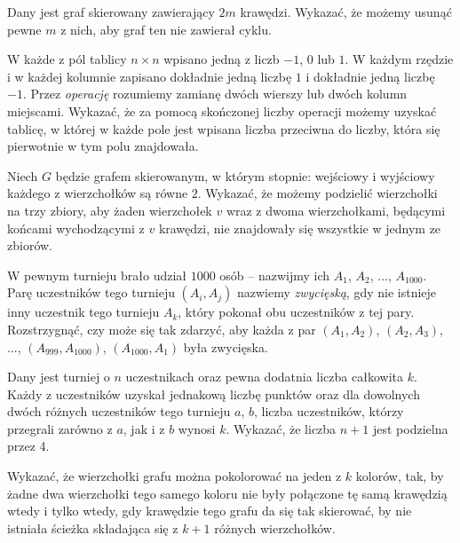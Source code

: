 \begin{problem}{1}
	Dany jest graf skierowany zawierający $2m$ krawędzi. Wykazać, że możemy usunąć pewne $m$ z nich, aby graf ten nie zawierał cyklu.
\end{problem}

\begin{problem}{2}
	W każde z pól tablicy $n\times n$ wpisano jedną z liczb $-1$, $0$ lub $1$. W każdym rzędzie i w każdej kolumnie zapisano dokładnie jedną liczbę $1$ i dokładnie jedną liczbę $-1$. Przez \textit{operację} rozumiemy zamianę dwóch wierszy lub dwóch kolumn miejscami. Wykazać, że za pomocą skończonej liczby operacji możemy uzyskać tablicę, w której w każde pole jest wpisana liczba przeciwna do liczby, która się pierwotnie w tym polu znajdowała.
\end{problem}

\begin{problem}{3}
	Niech $G$ będzie grafem skierowanym, w którym stopnie: wejściowy i wyjściowy każdego z wierzchołków są równe $2$. Wykazać, że możemy podzielić wierzchołki na trzy zbiory, aby żaden wierzchołek $v$ wraz z dwoma wierzchołkami, będącymi końcami wychodzącymi z $v$ krawędzi, nie znajdowały się wszystkie w jednym ze zbiorów.
\end{problem}

\begin{problem}{4}
	W pewnym turnieju brało udział $1000$ osób -- nazwijmy ich $A_1$, $A_2$, ..., $A_{1000}$. Parę uczestników tego turnieju $(A_i, A_j)$ nazwiemy \textit{zwycięską}, gdy nie istnieje inny uczestnik tego turnieju $A_k$, który pokonał obu uczestników z tej pary. Rozstrzygnąć, czy może się tak zdarzyć, aby każda z par $(A_1, A_2)$, $(A_2, A_3)$, ..., $(A_{999}, A_{1000})$, $(A_{1000}, A_{1})$ była zwycięska.
\end{problem}

\begin{problem}{5}
	Dany jest turniej o $n$ uczestnikach oraz pewna dodatnia liczba całkowita $k$. Każdy z uczestników uzyskał jednakową liczbę punktów oraz dla dowolnych dwóch różnych uczestników tego turnieju $a$, $b$, liczba uczestników, którzy przegrali zarówno z $a$, jak i z $b$ wynosi $k$. Wykazać, że liczba $n + 1$ jest podzielna przez 4.
\end{problem}

\begin{problem}{6}
	Wykazać, że wierzchołki grafu można pokolorować na jeden z $k$ kolorów, tak, by żadne dwa wierzchołki tego samego koloru nie były połączone tę samą krawędzią wtedy i tylko wtedy, gdy krawędzie tego grafu da się tak skierować, by nie istniała ścieżka składająca się z $k + 1$ różnych wierzchołków.
\end{problem}